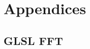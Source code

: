 \documentclass[
  oneside,
  11pt, a4paper,
  footinclude=true,
  headinclude=true,
  cleardoublepage=empty
]{scrbook}
\begin{document}
\cleardoublepage



\printindex

    \appendix
    \renewcommand\chaptername{Appendix}



\part{Appendices}

\chapter{GLSL FFT} \label{apdx:glsl-fft}
\end{document}
